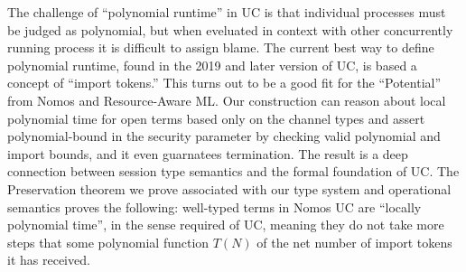    The challenge of “polynomial runtime” in UC is that individual processes must be judged as polynomial, but when eveluated in context with other concurrently running process it is difficult to assign blame.
       The current best way to define polynomial runtime, found in the 2019 and later version of UC, is based a concept of ``import tokens.''
       This turns out to be a good fit for the ``Potential'' from Nomos and Resource-Aware ML.
Our construction can reason about local polynomial time for open terms based only on the channel types and assert polynomial-bound in the security parameter by checking valid polynomial and import bounds, and it even guarnatees termination.
The result is a deep connection between session type semantics and the formal foundation of UC.
    The Preservation theorem we prove associated with our type system and operational semantics proves the following: 
  well-typed terms in Nomos UC are “locally polynomial time”, in the sense required of UC, meaning they do not take more steps that some polynomial function $T(N)$ of the net number of import tokens it has received.




   

